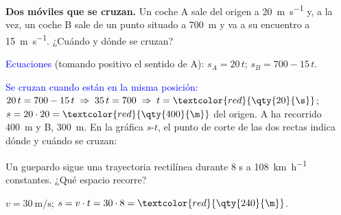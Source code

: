 \begin{example}
    \textbf{Dos móviles que se cruzan.} Un coche A sale del origen a \qty{20}{\m\per\s} y, a la vez, un coche B sale de un punto situado a \qty{700}{\m} y va a su encuentro a \qty{15}{\m\per\s}. ¿Cuándo y dónde se cruzan?

    \textcolor{blue}{Ecuaciones} (tomando positivo el sentido de A): \(s_A = 20\,t\); \quad \(s_B = 700 - 15\,t\).

    \textcolor{blue}{Se cruzan cuando están en la misma posición:} \(20\,t = 700 - 15\,t \;\Rightarrow\; 35\,t = 700 \;\Rightarrow\; t = \textcolor{red}{\qty{20}{\s}}\); \(s = 20 \cdot 20 = \textcolor{red}{\qty{400}{\m}}\) del origen. A ha recorrido \qty{400}{\m} y B, \qty{300}{\m}. En la gráfica \(s\)-\(t\), el punto de corte de las dos rectas indica dónde y cuándo se cruzan:
    \begin{center}
    \end{center}
\end{example}

\begin{exercise}
    Un guepardo sigue una trayectoria rectilínea durante 8 s a \qty{108}{\km\per\hour} constantes. ¿Qué espacio recorre?
    \begin{solu}
        \(v = \qty{30}{\m\per\s}\); \(s = v \cdot t = 30 \cdot 8 = \textcolor{red}{\qty{240}{\m}}\).
    \end{solu}
\end{exercise}

